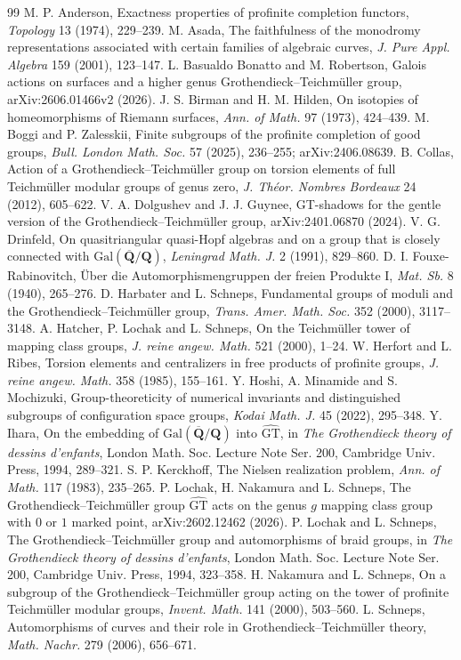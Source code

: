 \documentclass[11pt,a4paper]{article}
\theoremstyle{plain}
\theoremstyle{definition}
\theoremstyle{remark}
\newcommand{\GT}{\widehat{\mathrm{GT}}}
\begin{document}
\begin{thebibliography}{99}\small
{} M. P. Anderson, Exactness properties of profinite completion functors, \emph{Topology} 13 (1974),
229--239.
 M. Asada, The faithfulness of the monodromy representations associated with certain families of
algebraic curves, \emph{J. Pure Appl. Algebra} 159 (2001), 123--147.
 L. Basualdo Bonatto and M. Robertson, Galois actions on surfaces and a higher genus
Grothendieck--Teichm\"uller group, arXiv:2606.01466v2 (2026).
 J. S. Birman and H. M. Hilden, On isotopies of homeomorphisms of Riemann surfaces, \emph{Ann. of Math.}
97 (1973), 424--439.
 M. Boggi and P. Zalesskii, Finite subgroups of the profinite completion of good groups, \emph{Bull.
London Math. Soc.} 57 (2025), 236--255; arXiv:2406.08639.
 B. Collas, Action of a Grothendieck--Teichm\"uller group on torsion elements of full Teichm\"uller
modular groups of genus zero, \emph{J. Th\'eor. Nombres Bordeaux} 24 (2012), 605--622.
 V. A. Dolgushev and J. J. Guynee, GT-shadows for the gentle version of the Grothendieck--Teichm\"uller
group, arXiv:2401.06870 (2024).
 V. G. Drinfeld, On quasitriangular quasi-Hopf algebras and on a group that is closely connected with
$\mathrm{Gal}(\overline{\mathbf Q}/\mathbf Q)$, \emph{Leningrad Math. J.} 2 (1991), 829--860.
 D. I. Fouxe-Rabinovitch, \"Uber die Automorphismengruppen der freien Produkte I, \emph{Mat. Sb.} 8
(1940), 265--276.
 D. Harbater and L. Schneps, Fundamental groups of moduli and the Grothendieck--Teichm\"uller group,
\emph{Trans. Amer. Math. Soc.} 352 (2000), 3117--3148.
 A. Hatcher, P. Lochak and L. Schneps, On the Teichm\"uller tower of mapping class groups, \emph{J.
reine angew. Math.} 521 (2000), 1--24.
 W. Herfort and L. Ribes, Torsion elements and centralizers in free products of profinite groups,
\emph{J. reine angew. Math.} 358 (1985), 155--161.
 Y. Hoshi, A. Minamide and S. Mochizuki, Group-theoreticity of numerical invariants and distinguished
subgroups of configuration space groups, \emph{Kodai Math. J.} 45 (2022), 295--348.
 Y. Ihara, On the embedding of $\mathrm{Gal}(\overline{\mathbf Q}/\mathbf Q)$ into $\GT$, in \emph{The
Grothendieck theory of dessins d'enfants}, London Math. Soc. Lecture Note Ser. 200, Cambridge Univ. Press, 1994,
289--321.
 S. P. Kerckhoff, The Nielsen realization problem, \emph{Ann. of Math.} 117 (1983), 235--265.
 P. Lochak, H. Nakamura and L. Schneps, The Grothendieck--Teichm\"uller group $\GT$ acts on the genus
$g$ mapping class group with $0$ or $1$ marked point, arXiv:2602.12462 (2026).
 P. Lochak and L. Schneps, The Grothendieck--Teichm\"uller group and automorphisms of braid groups, in
\emph{The Grothendieck theory of dessins d'enfants}, London Math. Soc. Lecture Note Ser. 200, Cambridge Univ.
Press, 1994, 323--358.
 H. Nakamura and L. Schneps, On a subgroup of the Grothendieck--Teichm\"uller group acting on the
tower of profinite Teichm\"uller modular groups, \emph{Invent. Math.} 141 (2000), 503--560.
 L. Schneps, Automorphisms of curves and their role in Grothendieck--Teichm\"uller theory, \emph{Math.
Nachr.} 279 (2006), 656--671.
\end{thebibliography}
\end{document}
